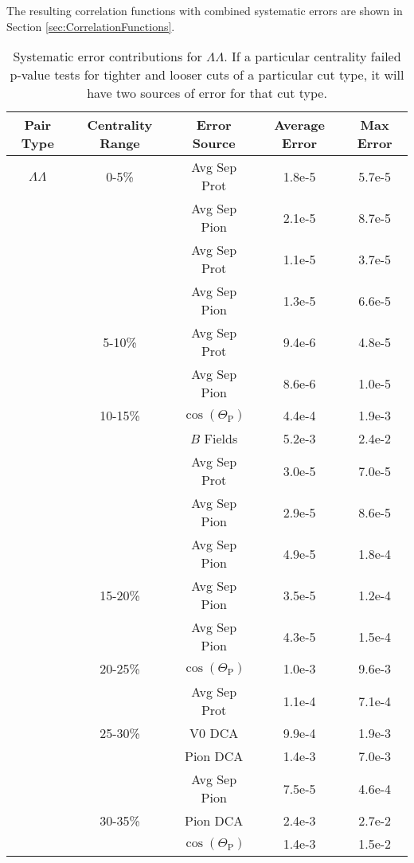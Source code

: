 The resulting correlation functions with combined systematic errors are shown in Section \ref{sec:CorrelationFunctions}.

\begin{table}
\caption[Systematic error contributions for $\Lambda\Lambda$] {Systematic error contributions for $\Lambda\Lambda$.  
If a particular centrality failed p-value tests for tighter and looser cuts of a particular cut type, it will have two sources of error for that cut type.} \label{tab:SysErrorSourcesLL} 
\begin{center}
\begin{tabular}{| c | c | c | c | c |}
  \hline                       
  Pair Type & Centrality Range & Error Source & Average Error & Max Error \\
  \hline
  $\Lambda\Lambda$ & 0-5\% & Avg Sep Prot & 1.8e-5 & 5.7e-5 \\
   &         & Avg Sep Pion & 2.1e-5 & 8.7e-5 \\
   &         & Avg Sep Prot & 1.1e-5 & 3.7e-5 \\
   &         & Avg Sep Pion & 1.3e-5 & 6.6e-5 \\
   & 5-10\%  & Avg Sep Prot & 9.4e-6 & 4.8e-5 \\
   &         & Avg Sep Pion & 8.6e-6 & 1.0e-5 \\
   & 10-15\% & $\cos(\Theta_{\mathrm{P}})$ & 4.4e-4 & 1.9e-3 \\
   &         & $B$ Fields & 5.2e-3 & 2.4e-2 \\
   &         & Avg Sep Prot & 3.0e-5 & 7.0e-5 \\
   &         & Avg Sep Pion & 2.9e-5 & 8.6e-5 \\
   &         & Avg Sep Pion & 4.9e-5 & 1.8e-4 \\
   & 15-20\% & Avg Sep Pion & 3.5e-5 &  1.2e-4 \\
   &         & Avg Sep Pion & 4.3e-5 & 1.5e-4 \\
   & 20-25\% & $\cos(\Theta_{\mathrm{P}})$ & 1.0e-3 & 9.6e-3 \\
   &         & Avg Sep Prot & 1.1e-4 & 7.1e-4 \\
   & 25-30\% & V0 DCA & 9.9e-4 & 1.9e-3\\
   &	         & Pion DCA & 1.4e-3 & 7.0e-3\\
   &         & Avg Sep Pion & 7.5e-5 & 4.6e-4 \\
   & 30-35\% & Pion DCA & 2.4e-3 & 2.7e-2 \\
   &         & $\cos(\Theta_{\mathrm{P}})$ & 1.4e-3 & 1.5e-2 \\

\end{tabular}
\end{center}
\end{table}
